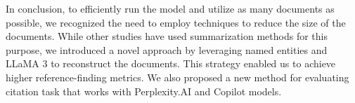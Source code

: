 In conclusion, to efficiently run the model and utilize as many documents as possible, we recognized the need to employ techniques to reduce the size of the documents. While other studies have used summarization methods for this purpose, we introduced a novel approach by leveraging named entities and LLaMA 3 to reconstruct the documents. This strategy enabled us to achieve higher reference-finding metrics. We also proposed a new method for evaluating citation task that works with Perplexity.AI and Copilot models.